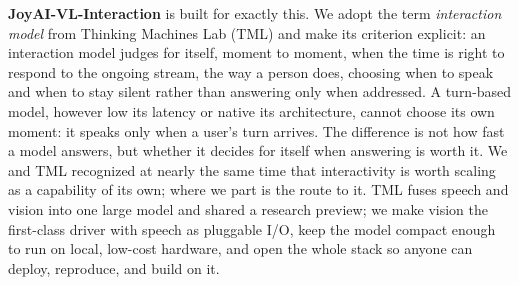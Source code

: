 
\textbf{JoyAI-VL-Interaction} is built for exactly this. We adopt the term \textit{interaction model} \cite{thinkingmachines2026interactionmodels} from Thinking Machines Lab (TML) and make its criterion explicit: an interaction model judges for itself, moment to moment, when the time is right to respond to the ongoing stream, the way a person does, choosing when to speak and when to stay silent rather than answering only when addressed. A turn-based model, however low its latency or native its architecture, cannot choose its own moment: it speaks only when a user's turn arrives. The difference is not how fast a model answers, but whether it decides for itself when answering is worth it. We and TML recognized at nearly the same time that interactivity is worth scaling as a capability of its own; where we part is the route to it. TML fuses speech and vision into one large model and shared a research preview; we make vision the first-class driver with speech as pluggable I/O, keep the model compact enough to run on local, low-cost hardware, and open the whole stack so anyone can deploy, reproduce, and build on it.

